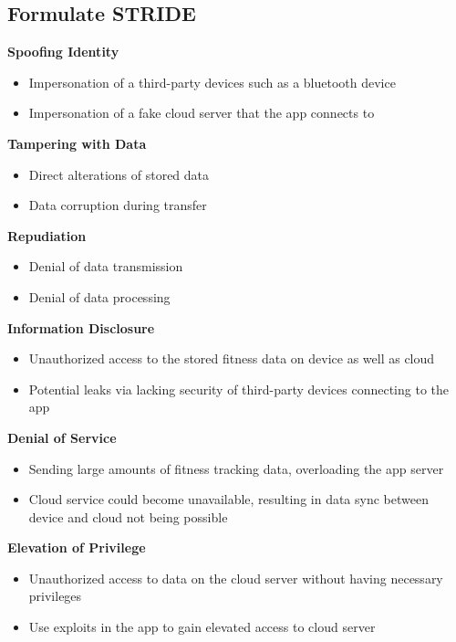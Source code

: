 \subsection{Formulate STRIDE}
\textbf{Spoofing Identity}
\begin{itemize}
  \item Impersonation of a third-party devices such as a bluetooth device
  \item Impersonation of a fake cloud server that the app connects to
\end{itemize}
\textbf{Tampering with Data}
\begin{itemize}
  \item Direct alterations of stored data
  \item Data corruption during transfer
\end{itemize}
\textbf{Repudiation}
\begin{itemize}
  \item Denial of data transmission
  \item Denial of data processing
\end{itemize}
\textbf{Information Disclosure}
\begin{itemize}
  \item Unauthorized access to the stored fitness data on device as well as cloud
  \item Potential leaks via lacking security of third-party devices connecting to the app
\end{itemize}
\textbf{Denial of Service}
\begin{itemize}
  \item Sending large amounts of fitness tracking data, overloading the app server
  \item Cloud service could become unavailable, resulting in data sync between device and cloud not being possible
\end{itemize}
\textbf{Elevation of Privilege}
\begin{itemize}
  \item Unauthorized access to data on the cloud server without having necessary privileges
  \item Use exploits in the app to gain elevated access to cloud server
\end{itemize}
